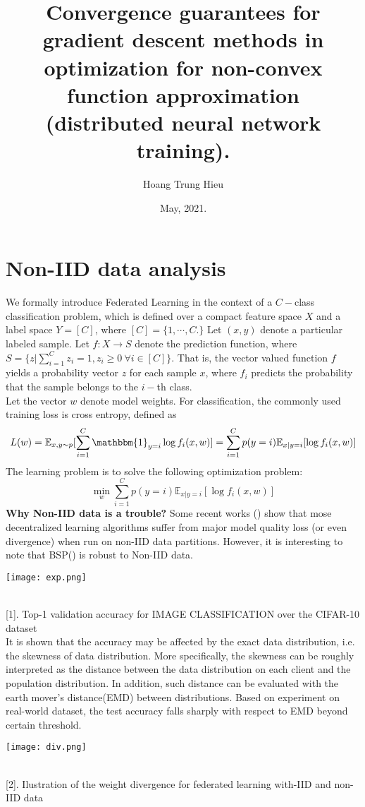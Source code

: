 \documentclass{article}
\title{Convergence guarantees for gradient descent methods in optimization for non-convex function approximation \\(distributed neural network training). }
\author{Hoang Trung Hieu}
\date{May, 2021.}
\theoremstyle{theorem}
\theoremstyle{definition}
\begin{document}
	\maketitle
	\section{Non-IID data analysis}
	We formally introduce Federated Learning in the context of a $C-$class
	classification problem, which is defined over a compact feature
	space $X$ and a label space $Y = [C]$, where $[C]=\{1, \cdots , C.\}$
	Let $(x, y)$ denote a particular labeled sample. Let $f : X  \rightarrow S$ denote the prediction function, where $S=\{z | \sum_{i=1}^C z_i =1 , z_i \geq 0\  \forall i \in [C]\}$. That is, the vector valued function $f$ yields a probability vector $z$ for each sample $x$, where $f_i$ predicts the probability that the sample belongs to the $i-$th class.\\
	Let the vector $w$ denote model weights. For classification,
	the commonly used training loss is cross entropy, defined as
	$$L(w) =\mathbb{E}_{x,y \sim p} [\sum_{i=1}^C \mathbbm{1}_{y=i} \log  f_i(x,w) ]=\sum_{i=1}^{C} p(y=i) \mathbb{E}_{x|y=i}[\log f_i(x,w)] $$
	The learning problem is to solve the following optimization
	problem:
	$$\min_{w} \sum_{i=1}^{C} p(y=i) \mathbb{E}_{x|y=i}[\log f_i(x,w)]$$
	\textbf{Why Non-IID data is a trouble?}  
	Some recent works (\cite{kevin2019noniid}) show that mose decentralized learning algorithms suffer from major model quality loss (or even divergence) when run on non-IID data partitions. However, it is interesting to note that BSP(\cite{bsp}) is robust to Non-IID data.\\
\begin{center}
		\texttt{[image: exp.png]}
\end{center}\\
	\figurename[1]{. Top-1 validation accuracy for IMAGE CLASSIFICATION over the CIFAR-10 dataset \cite{kevin2019noniid}}\\
	It is shown that the accuracy may be affected by the exact data distribution, i.e. the skewness of data distribution. More specifically, the skewness can be roughly interpreted as the distance between the data distribution on each client and the population distribution. In addition, such distance can be evaluated with the earth mover's distance(EMD) between distributions. Based on experiment on real-world dataset, the test accuracy falls sharply with respect to EMD beyond certain threshold. \\
\begin{center}
		\texttt{[image: div.png]}
\end{center}\\
	\figurename[2]{. Ilustration of the weight divergence for federated  learning with-IID and non-IID data \cite{zhao2018federated}}
\end{document}

